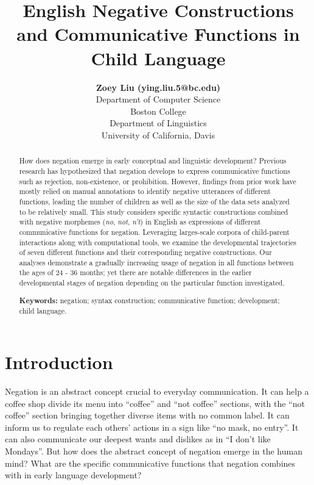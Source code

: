 \documentclass[10pt, letterpaper]{article}
\title{English Negative Constructions and Communicative Functions in Child
Language}
\author{{\large \bf Zoey Liu (ying.liu.5@bc.edu)} \\ Department of Computer Science \\ Boston College \AND {\large \bf Masoud Jasbi (jasbi@ucdavis.edu)} \\ Department of Linguistics \\ University of California, Davis}
\begin{document}
\maketitle

\begin{abstract}
How does negation emerge in early conceptual and linguistic development?
Previous research has hypothesized that negation develops to express
communicative functions such as rejection, non-existence, or
prohibition. However, findings from prior work have mostly relied on
manual annotations to identify negative utterances of different
functions, leading the number of children as well as the size of the
data sets analyzed to be relatively small. This study considers specific
syntactic constructions combined with negative morphemes (\emph{no},
\emph{not}, \emph{n't}) in English as expressions of different
communicative functions for negation. Leveraging larges-scale corpora of
child-parent interactions along with computational tools, we examine the
developmental trajectories of seven different functions and their
corresponding negative constructions. Our analyses demonstrate a
gradually increasing usage of negation in all functions between the ages
of 24 - 36 months; yet there are notable differences in the earlier
developmental stages of negation depending on the particular function
investigated.

\textbf{Keywords:}
negation; syntax construction; communicative function; development;
child language.
\end{abstract}

\hypertarget{introduction}{%
\section{Introduction}\label{introduction}}

Negation is an abstract concept crucial to everyday communication. It
can help a coffee shop divide its menu into ``coffee'' and ``not
coffee'' sections, with the ``not coffee'' section bringing together
diverse items with no common label. It can inform us to regulate each
others' actions in a sign like ``no mask, no entry''. It can also
communicate our deepest wants and dislikes as in ``I don't like
Mondays''. But how does the abstract concept of negation emerge in the
human mind? What are the specific communicative functions that negation
combines with in early language development?
\end{document}
